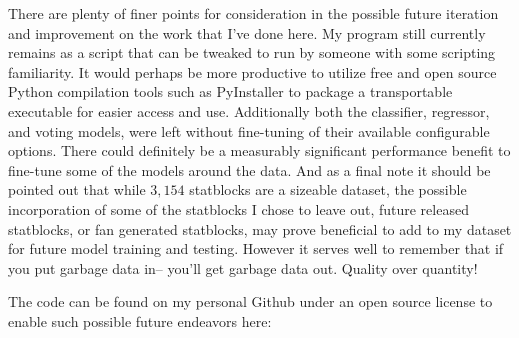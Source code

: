 \documentclass[11pt]{article}
\begin{document}
There are plenty of finer points for consideration in the possible future iteration and improvement on the work that I've done here. My program still currently remains as a script that can be tweaked to run by someone with some scripting familiarity. It would perhaps be more productive to utilize free and open source Python compilation tools such as PyInstaller \cite{pyinstaller} to package a transportable executable for easier access and use. Additionally both the classifier, regressor, and voting models, were left without fine-tuning of their available configurable options. There could definitely be a measurably significant performance benefit to fine-tune some of the models around the data. And as a final note it should be pointed out that while $3,154$ statblocks are a sizeable dataset, the possible incorporation of some of the statblocks I chose to leave out, future released statblocks, or fan generated statblocks, may prove beneficial to add to my dataset for future model training and testing. However it serves well to remember that if you put garbage data in-- you'll get garbage data out. Quality over quantity!

The code can be found on my personal Github under an open source license to enable such possible future endeavors here:

\newpage

\printbibliography
\end{document}
